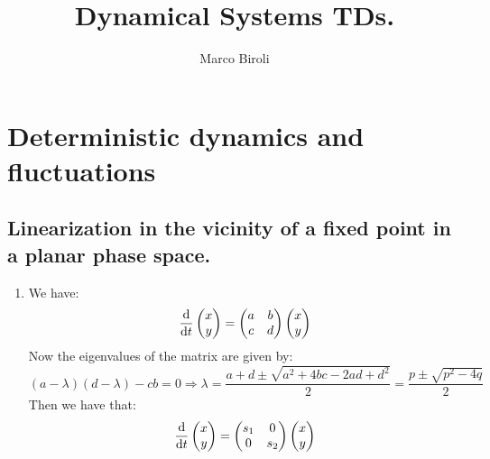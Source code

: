 \documentclass[10pt,a4paper]{book}
\author{Marco Biroli}
\title{Dynamical Systems TDs.}
\begin{document}
\maketitle
\tableofcontents
\chapter{Deterministic dynamics and fluctuations}

\section{Linearization in the vicinity of a fixed point in a planar phase space.}

\begin{enumerate}
\item We have:
\[
\dv{}{t}
\begin{pmatrix}
x\\y
\end{pmatrix} = \begin{pmatrix}
a & b\\
c & d
\end{pmatrix}
\begin{pmatrix}
x\\
y
\end{pmatrix}
\]
Now the eigenvalues of the matrix are given by:
\[
(a - \lambda)(d - \lambda) - cb  = 0 \Rightarrow \lambda = \frac{a + d \pm \sqrt{a^2 + 4 bc - 2 ad + d^2}}{2} = \frac{p \pm \sqrt{p^2 - 4 q}}{2}
\]
Then we have that:
\[
\dv{}{t}
\begin{pmatrix}
x\\y
\end{pmatrix} = \begin{pmatrix}
s_1 & 0\\
0 & s_2
\end{pmatrix}
\begin{pmatrix}
x\\
y
\end{pmatrix}
\]


\end{enumerate}
\end{document}
